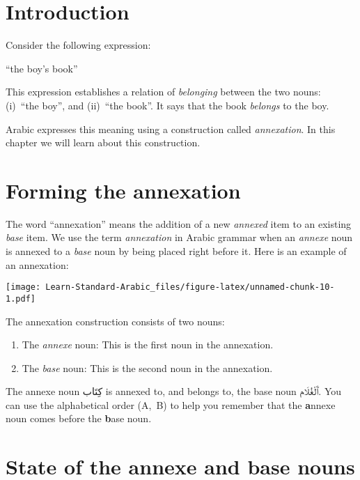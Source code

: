 \documentclass[
  10pt,
]{book}
\providecommand{\tightlist}{%
  \setlength{\itemsep}{0pt}\setlength{\parskip}{0pt}}
\begin{document}
\section{Introduction}\label{introduction-10}

Consider the following expression:

\enquote{the boy's book}

This expression establishes a relation of \emph{belonging} between the two nouns: (i)~\enquote{the boy}, and (ii)~\enquote{the book}. It says that the book \emph{belongs} to the boy.

Arabic expresses this meaning using a construction called \emph{annexation}. In this chapter we will learn about this construction.

\section{Forming the annexation}\label{forming-the-annexation}

The word \enquote{annexation} means the addition of a new \emph{annexed} item to an existing \emph{base} item. We use the term \emph{annexation} in Arabic grammar when an \emph{annexe} noun is annexed to a \emph{base} noun by being placed right before it. Here is an example of an annexation:

\texttt{[image: Learn-Standard-Arabic\_files/figure-latex/unnamed-chunk-10-1.pdf]}

The annexation construction consists of two nouns:

\begin{enumerate}
\def\labelenumi{\arabic{enumi}.}
\tightlist
\item
  The \emph{annexe} noun: This is the first noun in the annexation.
\item
  The \emph{base} noun: This is the second noun in the annexation.
\end{enumerate}

The annexe noun \foreignlanguage{arabic}{کِتَاب} is annexed to, and belongs to, the base noun \foreignlanguage{arabic}{ٱَلْغُلَام}.
You can use the alphabetical order (A,~B) to help you remember that the \textbf{a}nnexe noun comes before the \textbf{b}ase noun.

\section{State of the annexe and base nouns}\label{state-of-the-annexe-and-base-nouns}
\end{document}
